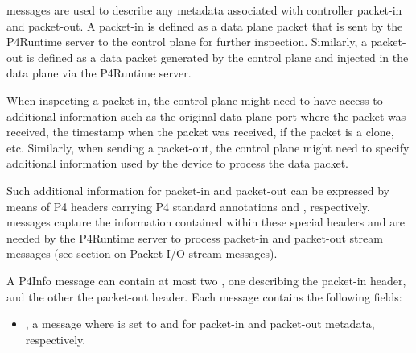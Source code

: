 \documentclass[11pt]{article}
\begin{document}
{%
\noindent{} messages are used to describe any metadata associated
with controller packet-in and packet-out. A packet-in is defined as a data plane
packet that is sent by the P4Runtime server to the control plane for further
inspection. Similarly, a packet-out is defined as a data packet generated by the
control plane and injected in the data plane via the P4Runtime server.%

When inspecting a packet-in, the control plane might need to have access to
additional information such as the original data plane port where the packet was
received, the timestamp when the packet was received, if the packet is a clone,
etc. Similarly, when sending a packet-out, the control plane might need to
specify additional information used by the device to process the data packet.%

Such additional information for packet-in and packet-out can be expressed by
means of P4 headers carrying P4 standard annotations
 and ,
respectively.  messages capture the information
contained within these special headers and are needed by the P4Runtime server to
process packet-in and packet-out stream messages (see section on Packet I/O
stream messages).%

A P4Info message can contain at most two ,
one describing the packet-in header, and the other the packet-out header. Each
message contains the following fields:%

\begin{itemize}%

\item{}
, a  message where  is set to 
and  for packet-in and packet-out metadata, respectively.%


\end{itemize}}
\end{document}
